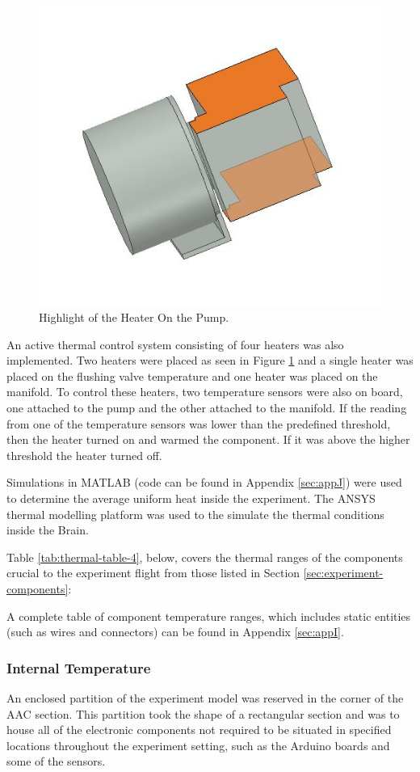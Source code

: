 \begin{figure}[H]
    \centering
    \includegraphics[width=0.5\linewidth]{4-experiment-design/img/Thermal/higlighted-heater-pump.JPG}
    \caption{Highlight of the Heater On the Pump.}
    \label{fig:highlight-heater-on-pump}
\end{figure}

An active thermal control system consisting of four heaters was also implemented. Two heaters were placed as seen in Figure \ref{fig:highlight-heater-on-pump} and a single heater was placed on the flushing valve temperature and one heater was placed on the manifold. To control these heaters, two temperature sensors were also on board, one attached to the pump and the other attached to the manifold. If the reading from one of the temperature sensors was lower than the predefined threshold, then the heater turned on and warmed the component. If it was above the higher threshold the heater turned off.

Simulations in MATLAB (code can be found in Appendix \ref{sec:appJ}) were used to determine the average uniform heat inside the experiment. The ANSYS thermal modelling platform was used to the simulate the thermal conditions inside the Brain.

Table {\ref{tab:thermal-table-4}}, below, covers the thermal ranges of the components crucial to the experiment flight from those listed in Section \ref{sec:experiment-components}:



\raggedbottom

A complete table of component temperature ranges, which includes static entities (such as wires and connectors) can be found in Appendix \ref{sec:appI}.

\subsubsection{Internal Temperature}
An enclosed partition of the experiment model was reserved in the corner of the AAC section. This partition took the shape of a rectangular section and was to house all of the electronic components not required to be situated in specified locations throughout the experiment setting, such as the Arduino boards and some of the sensors.

